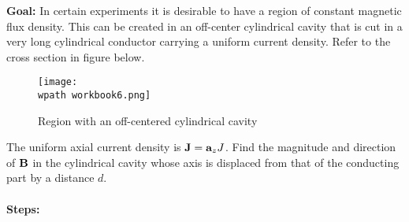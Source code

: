 \documentclass[../../header.tex]{subfiles}
\begin{document}
\textbf{Goal:} In certain experiments it is desirable to have a region of constant magnetic flux density. This can be created in an off-center cylindrical cavity that is cut in a very long cylindrical conductor carrying a uniform current density. Refer to the cross section in figure below. \\
\begin{figure}[h!]
\centering
\texttt{[image: \\wpath workbook6.png]}
\caption{Region with an off-centered cylindrical cavity}
\label{fig:workbook6}
\end{figure}

 The uniform axial current density is $\mathbf{J} = \mathbf{a}_z J$. Find the magnitude and direction of $\mathbf{B}$ in the cylindrical cavity whose axis is displaced from that of the conducting part by a distance $d$.\\
 \\
\textbf{Steps:} 
\end{document}
